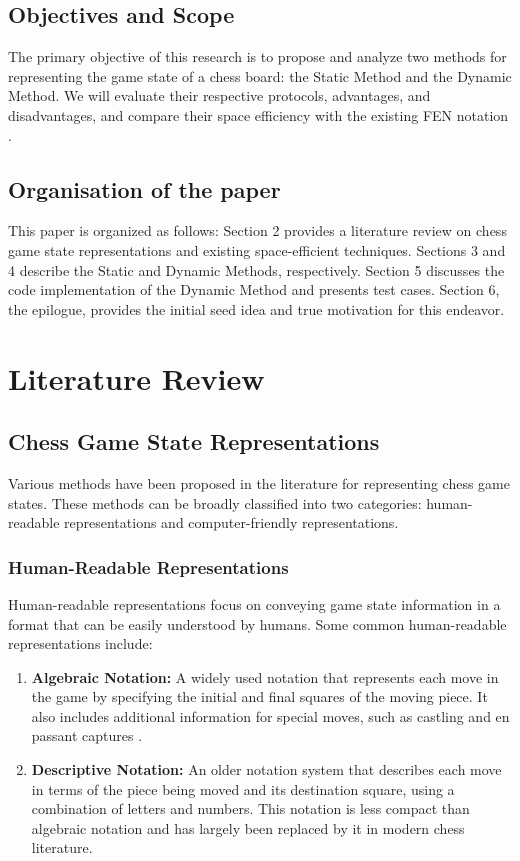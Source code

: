 \documentclass[journal]{journal}
\begin{document}
\subsection{Objectives and Scope}
The primary objective of this research is to propose and analyze two methods for representing the game state of a chess board: the Static Method and the Dynamic Method. We will evaluate their respective protocols, advantages, and disadvantages, and compare their space efficiency with the existing FEN notation \cite{edwards1994portable}.

\subsection{Organisation of the paper}
This paper is organized as follows: Section 2 provides a literature review on chess game state representations and existing space-efficient techniques. Sections 3 and 4 describe the Static and Dynamic Methods, respectively. Section 5 discusses the code implementation of the Dynamic Method and presents test cases. Section 6, the epilogue, provides the initial seed idea and true motivation for this endeavor.

\section{Literature Review}  
\subsection{Chess Game State Representations}  
Various methods have been proposed in the literature for representing chess game states. These methods can be broadly classified into two categories: human-readable representations and computer-friendly representations.  
   
\subsubsection{Human-Readable Representations}  
Human-readable representations focus on conveying game state information in a format that can be easily understood by humans. Some common human-readable representations include:  
   
\begin{enumerate}  
  \item \textbf{Algebraic Notation:} A widely used notation that represents each move in the game by specifying the initial and final squares of the moving piece. It also includes additional information for special moves, such as castling and en passant captures \cite{just2003united}.  
    
  \item \textbf{Descriptive Notation:} An older notation system that describes each move in terms of the piece being moved and its destination square, using a combination of letters and numbers. This notation is less compact than algebraic notation and has largely been replaced by it in modern chess literature.  
\end{enumerate}  
   
\end{document}

